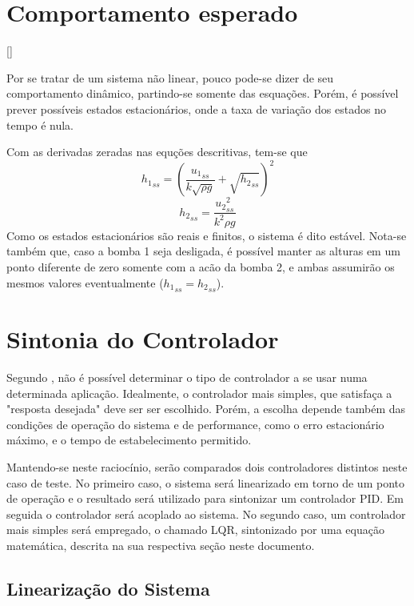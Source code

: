\section{Comportamento esperado}[\label{comportamento_esperado}]

Por se tratar de um sistema não linear, pouco pode-se dizer de seu comportamento dinâmico, partindo-se somente das esquações. Porém, é possível prever possíveis estados estacionários, onde a taxa de variação dos estados no tempo é nula.

Com as derivadas zeradas nas equções descritivas, tem-se que
\begin{equation}
{h_1}_{ss} = (\frac{{u_1}_{ss}}{k\sqrt{\rho g}} + \sqrt{{h_2}_{ss}})^2
\end{equation}
\begin{equation}
{h_2}_{ss} = \frac{{u_2}_{ss}^2}{k^2 \rho g}
\end{equation}
Como os estados estacionários são reais e finitos, o sistema é dito estável. Nota-se também que, caso a bomba 1 seja desligada, é possível manter as alturas em um ponto diferente de zero somente com a acão da bomba 2, e ambas assumirão os mesmos valores eventualmente (${h_1}_{ss} = {h_2}_{ss}$).

\section{Sintonia do Controlador}

Segundo \cite{Lourenco2007}, não é possível determinar o tipo de controlador a se usar numa determinada aplicação. Idealmente, o controlador mais simples, que satisfaça a "resposta desejada" deve ser ser escolhido. Porém, a escolha depende também das condições de operação do sistema e de performance, como o erro estacionário máximo, e o tempo de estabelecimento permitido.

Mantendo-se neste raciocínio, serão comparados dois controladores distintos neste caso de teste. No primeiro caso, o sistema será linearizado em torno de um ponto de operação e o resultado será utilizado para sintonizar um controlador PID. Em seguida o controlador será acoplado ao sistema. No segundo caso, um controlador mais simples será empregado, o chamado LQR, sintonizado por uma equação matemática, descrita na sua respectiva seção neste documento.

\subsection{Linearização do Sistema}

